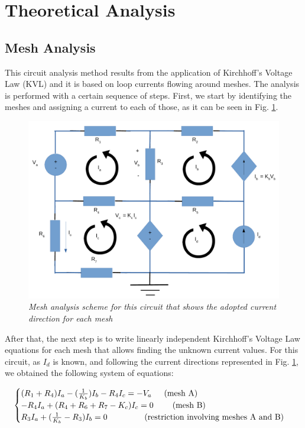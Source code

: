 \section{Theoretical Analysis}
\label{sec:theo}
\subsection{Mesh Analysis}
This circuit analysis method results from the application of Kirchhoff's Voltage Law (KVL) and it is based on loop currents flowing around meshes. The analysis is performed with a certain sequence of steps. First, we start by identifying the meshes and assigning a current to each of those, as it can be seen in Fig. \ref{fig:mesh_scheme}.

\begin{figure}[h]
    \centering
    \includegraphics[width = 0.7\linewidth]{mesh.pdf}
        \caption{\textit{Mesh analysis scheme for this circuit that shows the adopted current direction for each mesh}}
    \label{fig:mesh_scheme}
\end{figure}

After that, the next step is to write linearly independent Kirchhoff's Voltage Law equations for each mesh that allows finding the unknown current values. For this circuit, as $I_d$ is known, and following the current directions represented in Fig. \ref{fig:mesh_scheme}, we obtained the following system of equations:

\begin{equation}
    \begin{cases}
        (R_1+R_4)I_a - (\frac{1}{K_b})I_b - R_4I_c = -V_a \hspace{15px} \text{(mesh A)}\\
        -R_4I_a + (R_4 + R_6 + R_7 - K_c)I_c = 0 \hspace{23px} \text{(mesh B)}\\
        R_3I_a + (\frac{1}{K_b}-R_3)I_b = 0 \hspace{45px} \text{(restriction involving meshes A and B)}
    \end{cases}
\end{equation}

